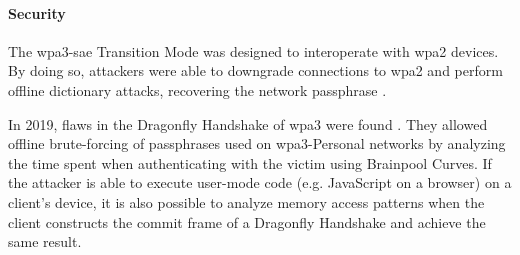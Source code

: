 \paragraph{Security}

The \gls{wpa}3-\gls{sae} Transition Mode was designed to interoperate with \gls{wpa}2 devices. By doing so, attackers were able to downgrade connections to \gls{wpa}2 and perform offline dictionary attacks, recovering the network passphrase \cite{dragonblood}.

In 2019, flaws in the Dragonfly Handshake of \gls{wpa}3 were found \cite{dragonblood}. They allowed offline brute-forcing of passphrases used on \gls{wpa}3-Personal networks by analyzing the time spent when authenticating with the victim using Brainpool Curves. If the attacker is able to execute user-mode code (e.g. JavaScript on a browser) on a client’s device, it is also possible to analyze memory access patterns when the client constructs the commit frame of a Dragonfly Handshake and achieve the same result.
